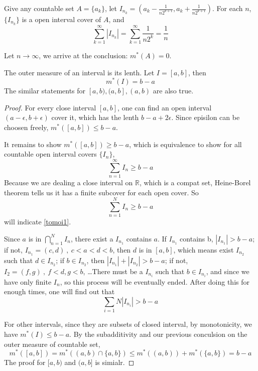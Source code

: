 \documentclass[lang=en, 12pt]{elegantbook}
\newcommand{\RR}{\mathbb{R}}
\begin{document}
            \begin{example}
                Give any countable set $ A = \{a_k\}$, let $I_{n_k} = (a_k-\frac{1}{n2^{k+1}},a_k+\frac{1}{n2^{k+1}})$. For each $n$, $\{I_{n_k}\}$
            is a open interval cover of $A$, and 
                $$\sum_{k=1}^{\infty}|I_{n_k}|=\sum_{k=1}^{\infty}\frac{1}{n2^k}=\frac{1}{n}$$ \par
                Let $n \to \infty$, we arrive at the conclusion: $m^*(A) = 0$.
            \end{example}
            \begin{proposition}
                The outer measure of an interval is its lenth. Let $I = [a,b]$, then $$m^*(I) = b-a $$
                The similar statements for $[a,b), (a,b], (a,b)$ are also true.\par
                
            \end{proposition}
            \begin{proof}
                For every close interval $[a,b]$, one can find an open interval $(a-\epsilon,b+\epsilon)$ cover it, which has the lenth 
            $b-a+2\epsilon$. Since episilon can be choosen freely, $m^*([a,b]) \leq b-a$. \par
                It remains to show $m^*([a,b]) \geq b-a$, which is
            equivalence to show for all countable open interval covers $\{I_n\}$, 
            \begin{equation}
                \sum_{n=1}^{\infty}I_n \geq b-a \label{tomoi1}
            \end{equation}
                Because we are dealing a
            close interval on $\RR$, which is a compat set, Heine-Borel theorem tells us it has a finite subcover for each open cover. So 
            \begin{equation}
                \sum_{n=1}^{N}I_n \geq b-a \label{tomoi2}
            \end{equation}
            will indicate \eqref{tomoi1}. \par
                Since $a$ is in $\bigcap_{n=1}^{N} I_n$, there exist a $I_{n_1}$ contains $a$. If $I_{n_1}$ contains b, $|I_{n_1}|>b-a$;
            if not, $I_{n_1} = (c,d) \ , \ c<a<d<b$, then $d$ is in $[a,b]$, which means exist  $I_{n_2}$ such that $d \in I_{n_2}$; if
            $b \in I_{n_2}$, then $|I_{n_1}|+|I_{n_2}|>b-a$; if not, $I_{2} = (f,g) \ , \ f<d,g<b$, \dots There must be a $I_{n_i}$ such that 
            $b \in I_{n_i}$, and since we have only finite $I_n$, so this process will be eventually ended. After doing this for enough times,
            one will find out that 
            $$\sum_{i=1}{N}|I_{n_i}|>b-a$$ \par
                For other intervals, since they are subsets of closed interval, by monotonicity, we have $m^*(I)\leq b-a$. By the subadditivity
            and our previous conculsion on the outer measure of countable set, $$m^*([a,b])=m^*((a,b)\cap \{a,b\})\leq m^*((a,b))+m^*(\{a,b\})=b-a$$
            The proof for $[a,b)$ and $(a,b]$ is simialr.
            \end{proof}
\end{document}
